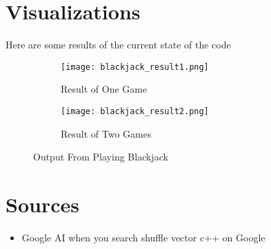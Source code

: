 \documentclass[twoside]{article}
\begin{document}
\section{Visualizations}
Here are some results of the current state of the code
\begin{figure}[h]
\begin{subfigure}{0.6\textwidth}
\texttt{[image: blackjack\_result1.png]} 
\caption{Result of One Game}
\label{fig:subim1}
\end{subfigure}
\begin{subfigure}{0.6\textwidth}
\texttt{[image: blackjack\_result2.png]}
\caption{Result of Two Games}
\label{fig:subim2}
\end{subfigure}
\caption{Output From Playing Blackjack}
\label{fig:image2}
\end{figure}

\section{Sources}
\begin{itemize}
    \item Google AI when you search shuffle vector c++ on Google
\end{itemize}
\end{document}

